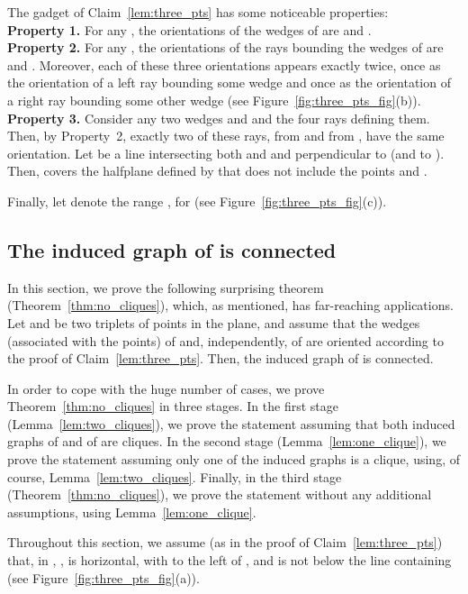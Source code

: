 \documentclass[11pt]{article}
\begin{document}
The gadget of Claim~\ref{lem:three_pts} has some noticeable properties:\\
{\bf Property 1.} For any , the orientations of the wedges of  are  and .\\ 
{\bf Property 2.} For any , the orientations of the rays bounding the wedges of  are  and . Moreover, each of these three orientations appears exactly twice, once as the orientation of a left ray bounding some wedge and once as the orientation of a right ray bounding some other wedge (see Figure~\ref{fig:three_pts_fig}(b)).\\
{\bf Property 3.} Consider any two wedges  and  and the four rays defining them. Then, by Property~2, exactly two of these rays,  from  and  from , have the same orientation. Let  be a line intersecting both  and  and perpendicular to  (and to ). Then,  covers the halfplane defined by  that does not include the points  and .

Finally, let  denote the range , for  (see Figure~\ref{fig:three_pts_fig}(c)).

  

\subsection{The induced graph of  is connected}
\label{sec:main_theorem}

In this section, we prove the following surprising theorem (Theorem~\ref{thm:no_cliques}), which, as mentioned, has far-reaching applications.
Let  and  be two triplets of points in the plane, and assume that the wedges (associated with the points) of  and, independently, of  are oriented according to the proof of Claim~\ref{lem:three_pts}. Then, the induced graph of  is connected. 

In order to cope with the huge number of cases, we prove Theorem~\ref{thm:no_cliques} in three stages.
In the first stage (Lemma~\ref{lem:two_cliques}), we prove the statement assuming that both induced graphs of  and of  are cliques. In the second stage (Lemma~\ref{lem:one_clique}), we prove the statement assuming only one of the induced graphs is a clique, using, of course, Lemma~\ref{lem:two_cliques}. Finally, in the third stage (Theorem~\ref{thm:no_cliques}), we prove the statement without any additional assumptions, using Lemma~\ref{lem:one_clique}.

Throughout this section, we assume (as in the proof of Claim~\ref{lem:three_pts}) that, in , ,  is horizontal, with  to the left of , and  is not below the line  containing  (see Figure~\ref{fig:three_pts_fig}(a)).     
\end{document}
